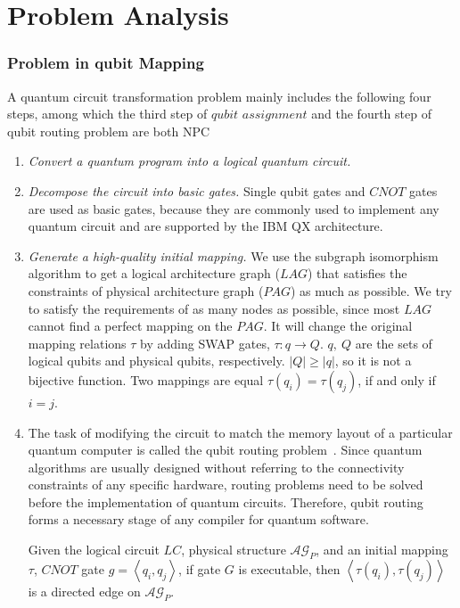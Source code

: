 \documentclass[runningheads]{llncs}
\begin{document}
\section{Problem Analysis}
\label{Problem Analysis}

\subsubsection{Problem in qubit Mapping}
A quantum circuit transformation problem mainly includes the following four steps, 
among which the third step of $qubit$ $assignment$ and the fourth step of qubit routing 
problem are both NPC~\cite{2018QubitSiraichi}
\begin{enumerate}
	\item \emph{Convert a quantum program into a logical quantum circuit.}
	\item \emph{Decompose the circuit into basic gates.} 
	Single qubit gates and $CNOT$ gates are used as basic gates, 
	because they are commonly used to implement any quantum circuit 
	and are supported by the IBM QX architecture.
	\item \emph{Generate a high-quality initial mapping.} 
	We use the subgraph isomorphism 
	algorithm to get a logical architecture graph ($LAG$) that satisfies 
	the constraints of physical architecture graph ($PAG$) as much as possible. 
	We try to satisfy the requirements of as many nodes as possible, since most 
	$LAG$ cannot find a perfect mapping 
	on the $PAG$.
	It will change the original mapping relations $\tau$ by adding SWAP gates, $\tau:q \rightarrow Q $. 
	$q,\ Q$ are the sets of logical qubits and physical qubits, respectively.
	$|Q| \geq |q|$, so it is not a bijective function.
	Two mappings are equal $\tau(q_{i})=\tau(q_{j})$, if and only if $i=j$.
	\item The task of modifying the circuit to match the memory layout of 
	a particular quantum computer is called the qubit routing problem~\cite{Cowtan2019}. 
	Since quantum algorithms are usually designed without referring to 
	the connectivity constraints of any specific hardware, routing problems 
	need to be solved before the implementation of quantum circuits. 
	Therefore, qubit routing forms a necessary stage of any compiler 
	for quantum software.

	Given the logical circuit $LC$, physical structure $\mathcal{AG}_{P}$, 
	and an initial mapping $\tau$, $CNOT$ gate $g=\left \langle q_{i},q_{j}\right \rangle $, 
	if gate $G$ is executable, then $\left \langle\tau(q_{i}),\tau(q_{j})\right \rangle $ 
	is a directed edge on $\mathcal{AG}_{P}$.
\end{enumerate}
\end{document}
